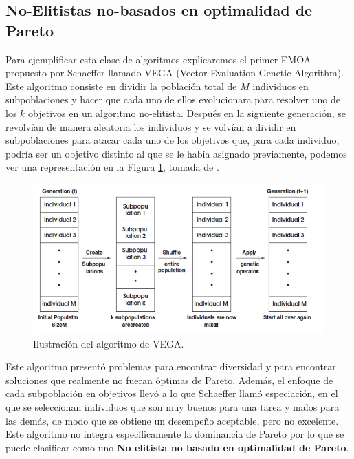 \subsection*{No-Elitistas no-basados en optimalidad de Pareto} \label{sec:VEGA}

Para ejemplificar esta clase de algoritmos explicaremos el primer EMOA propuesto por Schaeffer \cite{schafferMultipleObjectiveOptimization1984} llamado VEGA (Vector Evaluation Genetic Algorithm). Este algoritmo consiste en dividir la población total de $M$ individuos en subpoblaciones y hacer que cada uno de ellos evolucionara para resolver uno de los $k$ objetivos en un algoritmo no-elitista. Después en la siguiente generación, se revolvían de manera aleatoria los individuos y se volvían a dividir en subpoblaciones para atacar cada uno de los objetivos que, para cada individuo, podría ser un objetivo distinto al que se le había asignado previamente, podemos ver una representación en la Figura \ref{fig:VEGA}, tomada de \cite{coelloEvolutionaryAlgorithmsSolving}.

\begin{figure}[H]
    \centering
    \includegraphics[width=\textwidth]{Figuras/vega.png}
    \caption[VEGA]{Ilustración del algoritmo de VEGA.}
    \label{fig:VEGA}
\end{figure}

Este algoritmo presentó problemas para encontrar diversidad y para encontrar soluciones que realmente no fueran óptimas de Pareto. Además, el enfoque de cada subpoblación en objetivos llevó a lo que Schaeffer llamó especiación, en el que se seleccionan individuos que son muy buenos para una tarea y malos para las demás, de modo que se obtiene un desempeño aceptable, pero no excelente. Este algoritmo no integra específicamente la dominancia de Pareto por lo que se puede clasificar como uno \textbf{No elitista no basado en optimalidad de Pareto}.

